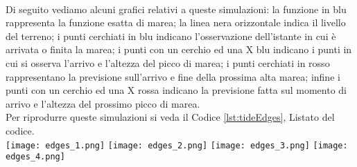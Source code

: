 	\\
	Di seguito vediamo alcuni grafici relativi a queste simulazioni: la funzione in blu rappresenta la funzione esatta di marea; la linea nera orizzontale indica il livello del terreno; i punti cerchiati in blu indicano l'osservazione dell'istante in cui è arrivata o finita la marea; i punti con un cerchio ed una X blu indicano i punti in cui si osserva l'arrivo e l'altezza del picco di marea; i punti cerchiati in rosso rappresentano la previsione sull'arrivo e fine della prossima alta marea; infine i punti con un cerchio ed una X rossa indicano la previsione fatta sul momento di arrivo e l'altezza del prossimo picco di marea.\\
	Per riprodurre queste simulazioni si veda il Codice \ref{lst:tideEdges}, Listato del codice.\\
	\texttt{[image: edges\_1.png]}
	\texttt{[image: edges\_2.png]}
	\texttt{[image: edges\_3.png]}
	\texttt{[image: edges\_4.png]}
	\FloatBarrier
